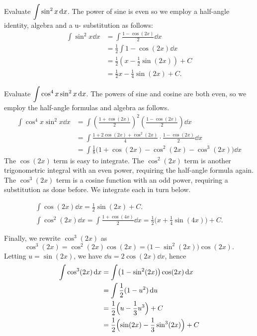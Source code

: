 
\begin{example}\label{ex_sub8}%
Evaluate $\displaystyle \int \sin^2x\operatorname{d}\! x$.
\solution
The power of sine is even so we employ a half-angle identity, algebra and a u- substitution as follows:
\begin{align*}
	\int \sin^2x\dd x
	&= \int \frac{1-\cos(2x)}2\dd x \\
	&= \frac12\int 1-\cos(2x)\dd x \\
	&= \frac12\left(x - \frac12\sin(2x)\right)+C \\
	&= \frac12x - \frac14\sin(2x) + C.
\end{align*}
\end{example}

\begin{example}\label{ex_trigint3}%
Evaluate $\displaystyle\int\cos^4x\sin^2x\operatorname{d}\! x$.
\solution
The powers of sine and cosine are both even, so we employ the half-angle formulas and algebra as follows.
\begin{align*}
	\int \cos^4x\sin^2x\dd x
	&= \int\left(\frac{1+\cos(2x)}{2}\right)^2\left(\frac{1-\cos(2x)}2\right)\dd x \\
	&= \int\frac{1+2\cos(2x)+\cos^2(2x)}4\cdot\frac{1-\cos(2x)}2\dd x\\
	&=	\int \frac18\bigl(1+\cos(2x)-\cos^2(2x)-\cos^3(2x)\bigr)\dd x
\end{align*}
The $\cos(2x)$ term is easy to integrate.
The $\cos^2(2x)$ term is another trigonometric integral with an even power, requiring the half-angle formula again. The $\cos^3(2x)$ term is a cosine function with an odd power, requiring a substitution as done before. We integrate each in turn below.

\begin{gather*}
\int\cos(2x)\dd x = \frac12\sin(2x)+C.\\
\int\cos^2(2x)\dd x = \int \frac{1+\cos(4x)}2\dd x
= \frac12\bigl(x+\frac14\sin(4x)\bigr)+C.
\end{gather*}

Finally, we rewrite $\cos^3(2x)$ as
\[\cos^3(2x) = \cos^2(2x)\cos(2x) = \bigl(1-\sin^2(2x)\bigr)\cos(2x).\]
Letting $u=\sin(2x)$, we have $\dd u = 2\cos(2x)\dd x$, hence
\begin{align*}
\int \cos^3(2x)\operatorname{d}\! x &= \int\bigl(1-\sin^2(2x)\bigr)\cos(2x)\operatorname{d}\! x\\
							&= \int \frac12(1-u^2)\operatorname{d}\! u\\
							&= \frac12\Bigl(u-\frac13u^3\Bigr)+C\\
							&=	\frac12\Bigl(\sin(2x)-\frac13\sin^3(2x)\Bigr)+C
\end{align*}


\end{example}
